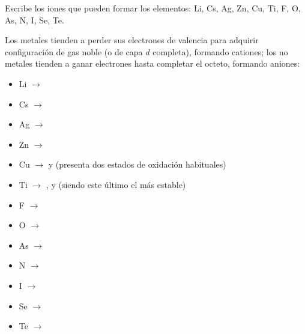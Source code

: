 \begin{exercise}
    Escribe los iones que pueden formar los elementos: Li, Cs, Ag, Zn, Cu, Ti, F, O, As, N, I, Se, Te.
    \begin{solu}

        Los metales tienden a perder sus electrones de valencia para adquirir configuración de gas noble (o de capa \(d\) completa), formando cationes; los no metales tienden a ganar electrones hasta completar el octeto, formando aniones:

        \begin{itemize}
            \item Li \(\rightarrow\) 
            \item Cs \(\rightarrow\) 
            \item Ag \(\rightarrow\) 
            \item Zn \(\rightarrow\) 
            \item Cu \(\rightarrow\)  y  (presenta dos estados de oxidación habituales)
            \item Ti \(\rightarrow\) ,  y  (siendo este último el más estable)
            \item F \(\rightarrow\) 
            \item O \(\rightarrow\) 
            \item As \(\rightarrow\) 
            \item N \(\rightarrow\) 
            \item I \(\rightarrow\) 
            \item Se \(\rightarrow\) 
            \item Te \(\rightarrow\) 
        \end{itemize}
    \end{solu}
\end{exercise}

